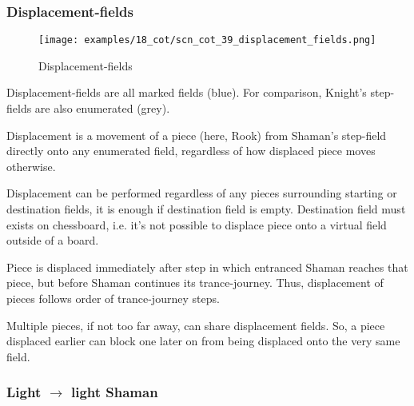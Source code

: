 \clearpage %

\subsubsection*{Displacement-fields}
\label{sec:Conquest of Tlalocan/Trance-journey/Interactions/Displacement-fields}

\vspace*{-1.5\baselineskip}
\noindent
\begin{figure}[!h]
\texttt{[image: examples/18\_cot/scn\_cot\_39\_displacement\_fields.png]}
\caption{Displacement-fields}
\label{fig:scn_cot_39_displacement_fields}
\end{figure}

Displacement-fields are all marked fields (blue). For comparison, Knight's
step-fields are also enumerated (grey).

Displacement is a movement of a piece (here, Rook) from Shaman's step-field directly
onto any enumerated field, regardless of how displaced piece moves otherwise.

Displacement can be performed regardless of any pieces surrounding starting or
destination fields, it is enough if destination field is empty. Destination field
must exists on chessboard, i.e. it's not possible to displace piece onto a virtual
field outside of a board.

Piece is displaced immediately after step in which entranced Shaman reaches that
piece, but before Shaman continues its trance-journey. Thus, displacement of pieces
follows order of trance-journey steps.

Multiple pieces, if not too far away, can share displacement fields. So, a piece
displaced earlier can block one later on from being displaced onto the very same
field.

\clearpage %

\subsubsection*{Light $\rightarrow$ light Shaman}
\label{sec:Conquest of Tlalocan/Trance-journey/Interactions/Light --> light Shaman}

